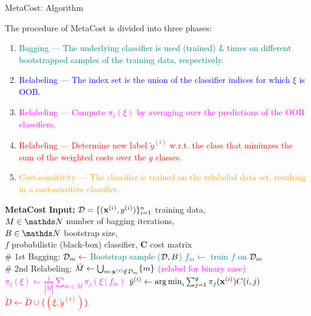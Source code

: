 \documentclass[11pt,compress,t,notes=noshow, xcolor=table]{beamer}
\begin{document}
\begin{vbframe}{MetaCost: Algorithm}
	
	\scriptsize{
%		
 	The procedure of MetaCost is divided into three phases:
		\begin{minipage}{0.53\textwidth} 
%				
				\begin{enumerate}
%					
					\scriptsize
					\item \textcolor{teal}{Bagging --- The underlying classifier is used (trained) $L$ times on different bootstrapped samples of the training data, respectively.}
%					

     				\item \textcolor{blue}{Relabeling --- The index set is the union of the classifier indices for which $\xi$ is OOB.}

                        \item \textcolor{magenta}{ Relabeling --- Compute $\pi_j(\xi)$ by averaging over the predictions of the OOB classifiers.}

                        \item \textcolor{red}{ Relabeling --- Determine new label $\tilde y^{(i)}$ w.r.t. the class that minimzes the sum of the weighted costs over the $g$ classes.}
%					
					\item \textcolor{orange}{Cost-sensitivity ---  The classifier is trained on the relabeled data set, resulting in a cost-sensitive classifier.}
%					
				\end{enumerate}
%

%		
		
		\end{minipage}
		\begin{minipage}{0.45\textwidth} 
			\begin{algorithmic}
				
				\tiny
%				
				\State \textbf{MetaCost}  
				\State \textbf{Input:} 
				$\mathcal{D} = \{(\mathbf{x}^{(i)},y^{(i)})\}_{i=1}^n$ training data, \\
				$M \in \N$ number of bagging iterations, \\
				$B \in \N$ bootstrap size, \\
				$f$ probabilistic (black-box) classifier, 
				$\mathbf{C}$ cost matrix \\
				  \# 1st Bagging:
				\textcolor{teal}{
					\State $\mathcal{D}_m  \leftarrow $ Bootstrap sample ($\mathcal{D},B$)
					\State $f_m  \leftarrow $ train $f$ on $\mathcal{D}_m$ 
                    \EndFor} \\
				 \# 2nd Relabeling:
				 \textcolor{blue}{
					 \State $\tilde M \leftarrow \bigcup_{m: \mathbf{x}^{(i)} \notin \mathcal{D}_m} \{m\}$
				\EndFor}
				\textcolor{magenta}{ (relabel for binary case)
				   \State $\pi_j(\xi)  \leftarrow \frac{1}{|\tilde M| } \sum_{m \in \tilde M}   \pi_j(\xi~|~ f_m) $
				\EndFor}
                    \textcolor{red}{\State $\tilde y^{(i)} \leftarrow \operatorname{arg\,min}_{i} \sum_{j=1}^g \pi_j(\mathbf{x}^{(i)}) C(i,j) $
				   \State $\tilde D \leftarrow \tilde D \cup \{(\xi,\tilde y^{(i)})\} $}
    

\end{algorithmic}
\end{minipage}}
\end{vbframe}
\end{document}
